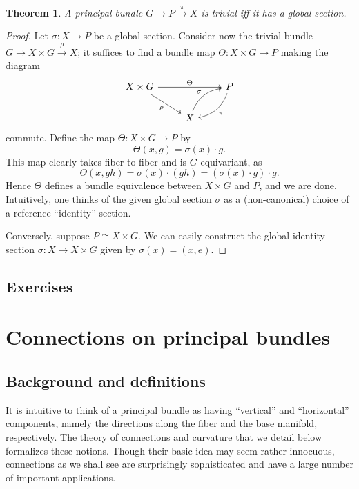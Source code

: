 \documentclass{book}
\theoremstyle{plain}
\newtheorem{thm}{Theorem}
\theoremstyle{definition}
\theoremstyle{remark}
\begin{document}
\begin{thm}
    A principal bundle $G\to P\overset{\pi}{\to} X$ is trivial iff it has a global section.
\end{thm}
\begin{proof}
    Let $\sigma:X\to P$ be a global section. Consider now the trivial bundle $G\to X\times G\overset{\rho}{\to}X$; it suffices to find a bundle map $\Theta: X\times G\to P$ making the diagram 
    \begin{equation*}
        \begin{tikzcd}
            X\times G\arrow{rr}{\Theta}\arrow[swap]{rd}{\rho}&&P\arrow[bend left]{ld}{\pi}\\
            &X\arrow[bend left]{ru}{\sigma}&
        \end{tikzcd}
    \end{equation*}
    commute. Define the map $\Theta:X\times G\to P$ by
    \[\Theta(x,g)=\sigma(x)\cdot g.\]
    This map clearly takes fiber to fiber and is $G$-equivariant, as
    \[\Theta(x,gh)=\sigma(x)\cdot (gh)=(\sigma(x)\cdot g)\cdot g.\]
    Hence $\Theta$ defines a bundle equivalence between $X\times G$ and $P$, and we are done. Intuitively, one thinks of the given global
    section $\sigma$ as a (non-canonical) choice of a reference ``identity'' section.

    Conversely, suppose $P\cong X\times G$. We can easily construct the global identity section $\sigma: X\to X\times G$ given by $\sigma(x)=(x,e)$.
\end{proof}

\section{Exercises}


\chapter{Connections on principal bundles}

\section{Background and definitions}

It is intuitive to think of a principal bundle as having ``vertical''  and ``horizontal'' components, namely the directions along the fiber and the base manifold,
respectively. The theory of connections and curvature that we detail below formalizes these notions. Though their basic idea may seem rather
innocuous, connections as we shall see are surprisingly sophisticated and have a large number of important applications. 
\end{document}
